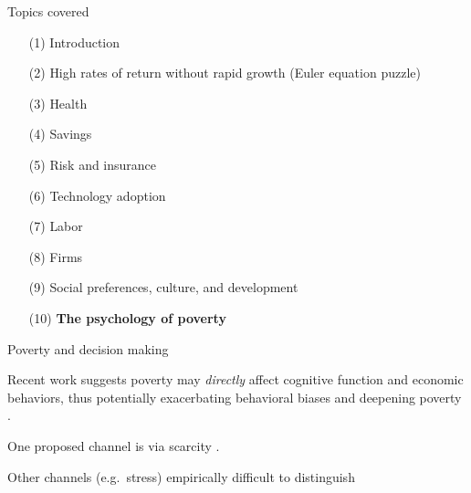 \documentclass[aspectratio=169, 10pt, handout]{beamer}
\newenvironment{wideitemize}{\itemize\addtolength{\itemsep}{10pt}}{\enditemize}
\begin{document}
\begin{frame}{Topics covered}

\small 

\begin{enumerate}[(1)]

	\item[(1)] Introduction 
	
	\item[(2)] {High rates of return without rapid growth (Euler equation puzzle)}

	\item[(3)] {Health}
	
	\item[(4)] {Savings}
		
	\item[(5)] {Risk and insurance}

	\item[(6)] {Technology adoption}
	
	\item[(7)] {Labor}

	\item[(8)] Firms
	
	\item[(9)] {Social preferences, culture, and development}
	
	\item[(10)] \textbf{The psychology of poverty}

\end{enumerate}

\end{frame}


\begin{frame}{Poverty and decision making}

\begin{wideitemize}

	\item Recent work suggests poverty may \textit{directly} affect cognitive function and economic behaviors, thus potentially exacerbating behavioral biases and deepening poverty \citep{haushofer2014psychology,schilbach2016psychological}.
	
    \item One proposed channel is via scarcity
	    \citep{mullainathan2013scarcity,mani2013poverty}.

    \item Other channels (e.g.\ stress) empirically difficult to distinguish

\end{wideitemize}

\end{frame}
\end{document}
